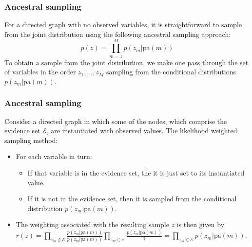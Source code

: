 \documentclass{beamer}
\begin{document}
\begin{frame}
    \frametitle{Ancestral sampling}
    For a directed graph with no observed variables, it is straightforward to sample from the joint distribution using the following ancestral sampling approach:
    \begin{equation*}
        p(z)=\prod_{m=1}^{M}p(z_{m}|\mathrm{pa}(m))
    \end{equation*}
    To obtain a sample from the joint distribution, we make one pass through the set of variables in the order $z_{1},\hdots,z_{M}$ sampling from the conditional distributions $p(z_{m}|\mathrm{pa}(m))$.
\end{frame}

\begin{frame}
    \frametitle{Ancestral sampling}
    Consider a directed graph in which some of the nodes, which comprise the evidence set $\mathcal{E}$, are instantiated with observed values. The likelihood weighted sampling method:
    \begin{itemize}
        \item For each variable in turn:
        \begin{itemize}
            \item If that variable is in the evidence set, the it is just set to its instantiated value.
            \item If it is not in the evidence set, then it is sampled from the conditional distribution $p(z_{m}|\mathrm{pa}(m))$.
        \end{itemize}
        \item The weighting associated with the resulting sample $z$ is then given by $r(z)=\prod_{z_{m}\notin\mathcal{E}}\frac{p(z_{m}|\mathrm{pa}(m))}{p(z_{m}|\mathrm{pa}(m))}\prod_{z_m\in\mathcal{E}}\frac{p(z_{m}|\mathrm{pa}(m))}{1}=\prod_{z_{m}\in\mathcal{E}}p(z_{m}|\mathrm{pa}(m))$.
    \end{itemize}
\end{frame}
\end{document}
